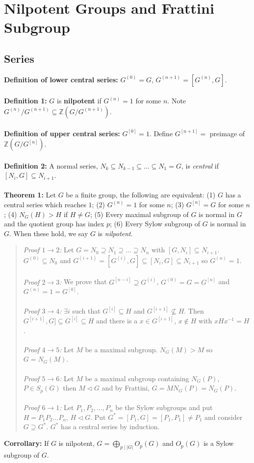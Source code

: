 \chapter{Nilpotent Groups and Frattini Subgroup}
\section{Series}
{\bf Definition of lower central series:} $G^{(0)}=G$, $G^{(n+1)} = [G^{(n)},G]$.
\\
\\
{\bf Definition 1:} $G$ is {\bf nilpotent} if
$G^{(n)}=1$ for some $n$.  Note $G^{(n)}/G^{(n+1)} \subseteq {\mathbb Z}(G/G^{(n+1)})$.
\\
\\
{\bf Definition of upper central series:}
$G^{[0]}=1$. Define $G^{[n+1]}= $ preimage of ${\mathbb Z}(G/G^{[n]})$.
\\
\\
{\bf Definition 2:}
A normal series, $N_k \subseteq N_{k-1} \subseteq  \ldots \subseteq N_1 = G$,
is \emph{central} if $[N_i , G] \subseteq N_{i+1}$.
\\
\\
{\bf Theorem 1:}  Let $G$ be a finite group, the following are equivalent:
(1) $G$ has a central series which reaches $1$;
(2) $G^{(n)} = 1$ for some $n$;
(3) $G^{[n]} = G$ for some $n$;
(4) $N_G(H) > H$ if $H \ne G$;
(5) Every maximal subgroup of $G$ is normal in $G$ and the quotient group has index $p$;
(6) Every Sylow subgroup of $G$ is normal in $G$.  When these hold, we say $G$ is
\emph {nilpotent}.
\begin{quote}
\emph{Proof $1 \rightarrow 2$:}
Let $G=N_0 \supseteq N_1 \supseteq \ldots \supseteq N_n$ with $[G, N_i] \subseteq N_{i+1}$.
$G^{(0)} \subseteq N_0$ and $G^{(i+1)}= [G^{(i)}, G] \subseteq [N_i, G] \subseteq N_{i+1}$
so $G^{(n)}=1$.
\\
\\
\emph{Proof $2 \rightarrow 3$:}
We prove that $G^{[n-i]} \supseteq G^{(i)}$, $G^{(0)}=G=G^{[n]}$ and $G^{(n)}=1=G^{[0]}$.
\\
\\
\emph{Proof $3 \rightarrow 4$:}
$\exists i$ such that $G^{[i]} \subseteq H$ and $G^{[i+1]} \nsubseteq H$.  Then
$G^{[i+1]}, G] \subseteq G^{[i]} \subseteq H$ and there is a $x \in G^{[i+1]}$,
$x \notin H$ with $xHx^{-1}=H$.
\\
\\
\emph{Proof $4 \rightarrow 5$:}
Let $M$ be a maximal subgroup.  $N_G(M) > M$ so $G= N_G(M)$.
\\
\\
\emph{Proof $5 \rightarrow 6$:}
Let $M$ be a maximal subgroup containing $N_G(P)$, $P \in S_p(G)$ then $M \lhd G$ and
by Frattini, $G= M N_G(P)= N_G(P)$.
\\
\\
\emph{Proof $6 \rightarrow 1$:}
Let $P_1, P_2, \ldots, P_n$ be the Sylow subgroups and put $H= P_1 P_2 \ldots P_n$,
$H \lhd G$.  Put $G^*= [P_1, G]= [P_1, P_1] \ne P_1$ and consider
$G \supseteq G^*$.  $G^*$ has a central series by induction.
\end{quote}
{\bf Corrollary:}  If $G$ is nilpotent, $G= \bigoplus_{p \mid |G|} O_p(G)$ and 
$O_p(G)$ is a Sylow subgroup of $G$.
